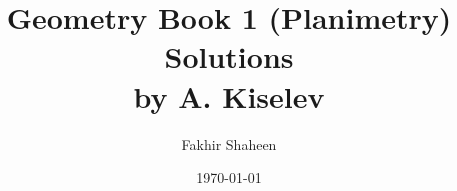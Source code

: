 \documentclass[a4paper,12pt]{book}
\begin{document}
\author{Fakhir Shaheen}
\title{Geometry Book 1 (Planimetry)\\Solutions\\\small{by A. Kiselev}}
\date{\today}

\frontmatter
\maketitle
\tableofcontents

\mainmatter




\backmatter
\end{document}
